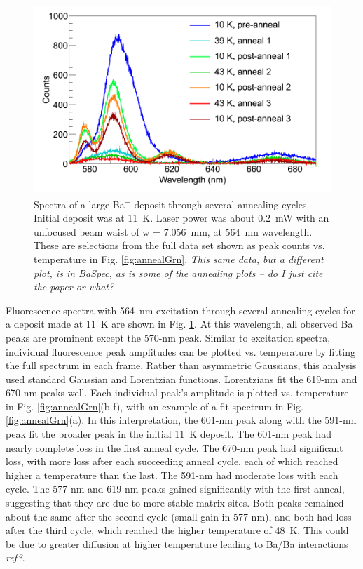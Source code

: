 \begin{figure} %
        \centering
                \includegraphics[width=.95\textwidth]{figures/spectra_annealing.png}
                \caption{Spectra of a large Ba\textsuperscript{+} deposit through several annealing cycles.  Initial deposit was at 11~K.  Laser power was about 0.2~mW with an unfocused beam waist of w = 7.056~mm, at 564~nm wavelength.  These are selections from the full data set shown as peak counts vs. temperature in Fig. \ref{fig:annealGrn}.  \emph{\color{red}This same data, but a different plot, is in BaSpec, as is some of the annealing plots -- do I just cite the paper or what?}}
\label{fig:specAnneal}
\end{figure}

Fluorescence spectra with 564~nm excitation through several annealing cycles for a deposit made at 11~K are shown in Fig. \ref{fig:specAnneal}.  At this wavelength, all observed Ba peaks are prominent except the 570-nm peak.  Similar to excitation spectra, individual fluorescence peak amplitudes can be plotted vs. temperature by fitting the full spectrum in each frame.  Rather than asymmetric Gaussians, this analysis used standard Gaussian and Lorentzian functions.  Lorentzians fit the 619-nm and 670-nm peaks well.  Each individual peak's amplitude is plotted vs. temperature in Fig. \ref{fig:annealGrn}(b-f), with an example of a fit spectrum in Fig. \ref{fig:annealGrn}(a).  In this interpretation, the 601-nm peak along with the 591-nm peak fit the broader peak in the initial 11~K deposit.  The 601-nm peak had nearly complete loss in the first anneal cycle.  The 670-nm peak had significant loss, with more loss after each succeeding anneal cycle, each of which reached higher a temperature than the last.  The 591-nm had moderate loss with each cycle.  The 577-nm and 619-nm peaks gained significantly with the first anneal, suggesting that they are due to more stable matrix sites.  Both peaks remained about the same after the second cycle (small gain in 577-nm), and both had loss after the third cycle, which reached the higher temperature of 48~K. This could be due to greater diffusion at higher temperature leading to Ba/Ba interactions \emph{\color{gray}ref?}.

